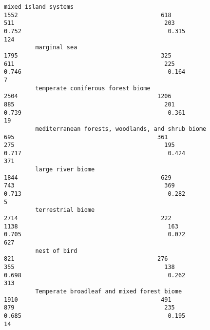 \documentclass{article}
\begin{document}
\begin{Verbatim}[commandchars=\\\{\}]
         mixed island systems                                                                              1552                                         618                                                511                                           203                                    0.752                                          0.315                124
         marginal sea                                                                                      1795                                         325                                                611                                           225                                    0.746                                          0.164                  7
         temperate coniferous forest biome                                                                 2504                                        1206                                                885                                           201                                    0.739                                          0.361                 19
         mediterranean forests, woodlands, and shrub biome                                                  695                                         361                                                275                                           195                                    0.717                                          0.424                371
         large river biome                                                                                 1844                                         629                                                743                                           369                                    0.713                                          0.282                  5
         terrestrial biome                                                                                 2714                                         222                                               1138                                           163                                    0.705                                          0.072                627
         nest of bird                                                                                       821                                         276                                                355                                           138                                    0.698                                          0.262                313
         Temperate broadleaf and mixed forest biome                                                        1910                                         491                                                879                                           235                                    0.685                                          0.195                 14

\end{Verbatim}
\end{document}
